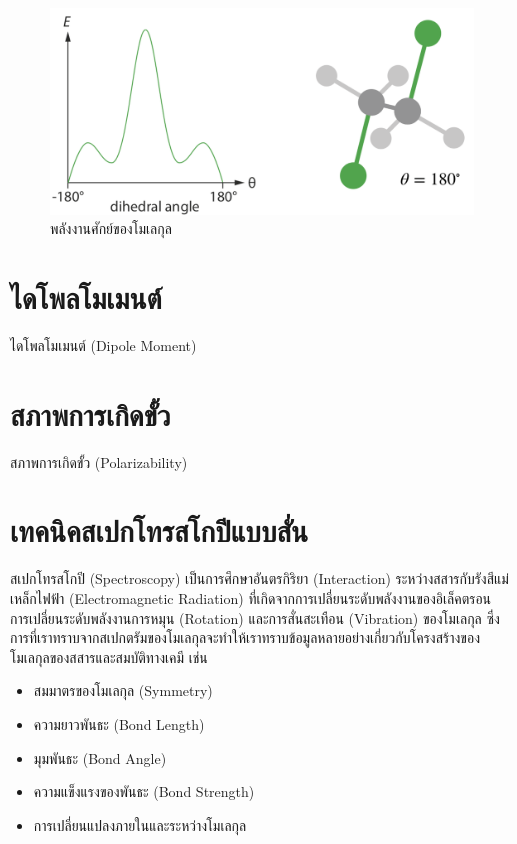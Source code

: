 \begin{figure}[htbp]
    \centering
    \includegraphics[width=0.8\linewidth]{fig/PES_C2H4Cl2.png}
    \caption{พลังงานศักย์ของโมเลกุล }
    \label{fig:pes_c2h4cl2}
\end{figure}

\section{ไดโพลโมเมนต์}
\label{sec:dipole_moment}

ไดโพลโมเมนต์ (Dipole Moment)


\section{สภาพการเกิดขั้ว}
\label{sec:polariz}

สภาพการเกิดขั้ว (Polarizability)

\section{เทคนิคสเปกโทรสโกปีแบบสั่น}
\label{sec:spectro}

สเปกโทรสโกปี (Spectroscopy) เป็นการศึกษาอันตรกิริยา (Interaction) ระหว่างสสารกับรังสีแม่เหล็กไฟฟ้า (Electromagnetic Radiation) 
ที่เกิดจากการเปลี่ยนระดับพลังงานของอิเล็คตรอน การเปลี่ยนระดับพลังงานการหมุน (Rotation) และการสั่นสะเทือน (Vibration) ของโมเลกุล 
ซึ่งการที่เราทราบจากสเปกตรัมของโมเลกุลจะทำให้เราทราบข้อมูลหลายอย่างเกี่ยวกับโครงสร้างของโมเลกุลของสสารและสมบัติทางเคมี เช่น

\begin{itemize}
    \item สมมาตรของโมเลกุล (Symmetry)
    
    \item ความยาวพันธะ (Bond Length)
    
    \item มุมพันธะ (Bond Angle)
    
    \item ความแข็งแรงของพันธะ (Bond Strength)
    
    \item การเปลี่ยนแปลงภายในและระหว่างโมเลกุล
\end{itemize}

